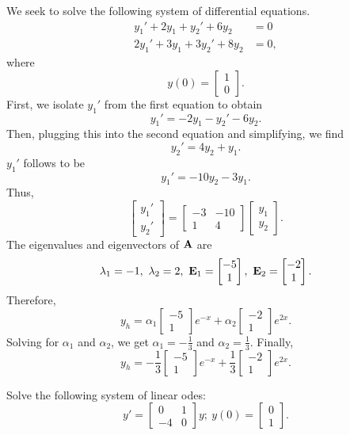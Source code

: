 \begin{example}
    We seek to solve the following system of differential equations.
    \begin{align*}
        y_1'+2y_1+y_2'+6y_2 &= 0 \\
        2y_1'+3y_1+3y_2'+8y_2 &= 0,
    \end{align*}
    where $$y(0) = \begin{bmatrix} 1 \\ 0\end{bmatrix}.$$
    First, we isolate $y_1'$ from the first equation to obtain
    $$y_1' = -2y_1-y_2'-6y_2.$$ Then, plugging this into the second equation and
    simplifying, we find $$y_2' = 4y_2+y_1.$$ $y_1'$ follows to be
    $$y_1' = -10y_2-3y_1.$$ Thus, 
    $$\begin{bmatrix}y_1' \\ y_2' \end{bmatrix} = 
    \begin{bmatrix} -3 & -10 \\ 1 & 4 \end{bmatrix}\begin{bmatrix}y_1 \\ y_2 \end{bmatrix}.$$
    The eigenvalues and eigenvectors of $\bold{A}$ are 
    $$\lambda_1 = -1,~\lambda_2 = 2, ~ \bold{E}_1 = 
    \begin{bmatrix}-5 \\ 1\end{bmatrix}, ~ \bold{E}_2 = \begin{bmatrix} -2 \\ 1\end{bmatrix}.$$
    Therefore, $$y_h = \alpha_1\begin{bmatrix}-5 \\ 1\end{bmatrix}e^{-x}
    +\alpha_2 \begin{bmatrix} -2 \\ 1\end{bmatrix}e^{2x}.$$
    Solving for $\alpha_1$ and $\alpha_2$, we get $\alpha_1 = -\frac{1}{3}$
    and $\alpha_2 = \frac{1}{3}$. Finally,
    $$y_h = -\frac{1}{3}\begin{bmatrix}-5 \\ 1\end{bmatrix}e^{-x}
    +\frac{1}{3} \begin{bmatrix} -2 \\ 1\end{bmatrix}e^{2x}.$$
\end{example}
\begin{exercise}
    Solve the following system of linear odes: 
    $$y' = \begin{bmatrix} 0 & 1 \\ -4 & 0\end{bmatrix}y;~y(0)=
    \begin{bmatrix} 0 \\ 1\end{bmatrix}.$$
\end{exercise}

